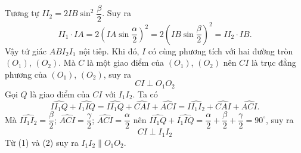 \begin{bt}
{		Tương tự $II_2=2IB\sin^2 \dfrac{\beta}{2}$. Suy ra 
		\[II_1 \cdot IA =2 \left (IA \sin \dfrac{\alpha}{2}\right )^2 =2 \left (IB \sin \dfrac{\beta}{2}\right )^2=II_2 \cdot IB.\]
		Vậy tứ giác $ABI_2I_1$ nội tiếp. Khi đó, $I$ có cùng phương tích với hai đường tròn $(O_1)$, $(O_2)$. Mà $C$ là một giao điểm của $(O_1)$, $(O_2)$ nên $CI$ là trục đẳng phương của $(O_1)$, $(O_2)$, suy ra \[CI \perp O_1O_2 \tag{1}\] 
		Gọi $Q$ là giao điểm của $CI$ với $I_1I_2$. Ta có  
		\[\widehat{II_1Q} + \widehat{I_1IQ}=\widehat{II_1Q} +\widehat{CAI}+\widehat{ACI}=\widehat{II_1I_2} +\widehat{CAI}+\widehat{ACI}.\]
		Mà $\widehat{II_1I_2} =\dfrac{\beta}{2}$; $\widehat{ACI} =\dfrac{\gamma}{2}$; $\widehat{ACI} =\dfrac{\alpha}{2}$ nên $\widehat{II_1Q}+\widehat{I_1IQ} = \dfrac{\alpha}{2} + \dfrac{\beta}{2} + \dfrac{\gamma}{2} = 90^\circ$, suy ra \[CI \perp I_1I_2 \tag{2}\]
		Từ (1) và (2) suy ra $I_1I_2 \parallel O_1O_2$.
	}
\end{bt}
